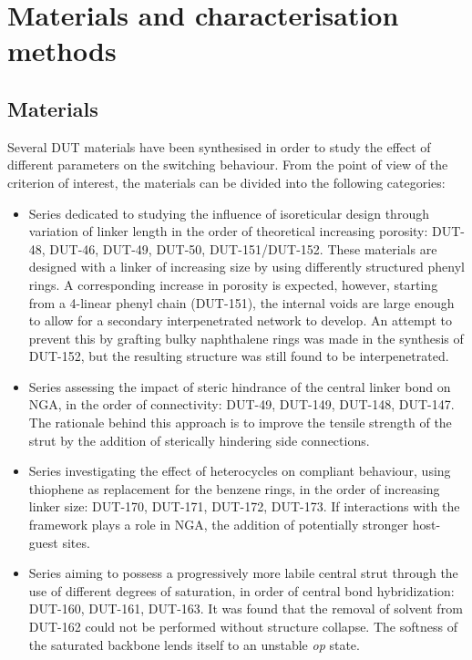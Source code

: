 
\section{Materials and characterisation methods}

\subsection{Materials}

Several DUT materials have been synthesised in order to 
study the effect of different parameters on the switching 
behaviour. From the point of view of the criterion of interest,
the materials can be divided into the following categories:

\begin{itemize}
    \item Series dedicated to studying the influence of isoreticular
    design through variation of linker length in the order of 
    theoretical increasing porosity: DUT-48, DUT-46, DUT-49, 
    DUT-50, DUT-151/DUT-152. These materials are designed 
    with a linker of increasing size by using differently 
    structured phenyl rings. A corresponding increase in 
    porosity is expected, however, starting from a 4-linear
    phenyl chain (DUT-151), the internal voids are large enough to 
    allow for a secondary interpenetrated network to develop.
    An attempt to prevent this by grafting bulky naphthalene 
    rings was made in the synthesis of DUT-152, but the resulting 
    structure was still found to be interpenetrated.
    
    \item Series assessing the impact of steric hindrance of the 
    central linker bond on NGA, in the order of connectivity:
    DUT-49, DUT-149, DUT-148, DUT-147. The rationale behind this
    approach is to improve the tensile strength of the strut by 
    the addition of sterically hindering side connections.

    \item Series investigating the effect of heterocycles on compliant
    behaviour, using thiophene as replacement for the benzene rings, 
    in the order of increasing linker size: DUT-170, DUT-171, DUT-172,
    DUT-173. If interactions with the framework plays a role in NGA,
    the addition of potentially stronger host-guest sites.

    \item Series aiming to possess a progressively more labile central 
    strut through the use of different degrees of saturation,
    in order of central bond hybridization: DUT-160, DUT-161, DUT-163.
    It was found that the removal of solvent from DUT-162 could not be 
    performed without structure collapse. The softness of the saturated
    backbone lends itself to an unstable \textit{op} state.


\end{itemize}
